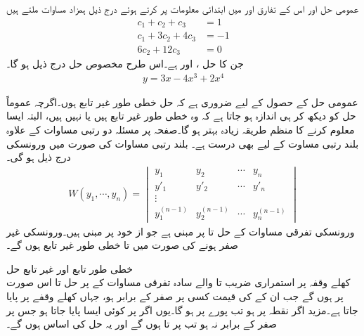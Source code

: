 عمومی حل اور اس کے تفارق  اور  میں ابتدائی معلومات پر کرتے ہوئے درج ذیل ہمزاد مساوات ملتے ہیں
\begin{align*}
c_1+c_2+c_3&=1\\
c_1+3c_2+4c_3&=-1\\
6c_2+12c_3&=0
\end{align*}
جن کا حل ،  اور  ہے۔اس طرح مخصوص حل درج ذیل ہو گا۔
\begin{align*}
y=3x-4x^3+2x^4
\end{align*}

عمومی حل کے حصول کے لیے ضروری ہے کہ حل خطی طور غیر تابع ہوں۔اگرچہ عموماً حل کو دیکھ کر ہی اندازہ ہو جاتا ہے کہ  وہ خطی طور غیر تابع ہیں یا نہیں ہیں، البتہ ایسا معلوم کرنے کا منظم طریقہ زیادہ بہتر ہو گا۔صفحہ  پر مسئلہ  دو رتبی   مساوات کے علاوہ بلند رتبی مساوت کے لیے بھی درست ہے۔ بلند رتبی مساوات کی صورت میں ورونسکی درج ذیل ہو گی۔
\begin{align}\label{مساوات_سادہ_بلند_ورونسکی_الف}
W(y_1,\cdots, y_n)=
\begin{vmatrix}
y_1 & y_2 & \cdots & y_n\\
y'_1 & y'_2 & \cdots & y'_n\\
\vdots & & \\
y_1^{(n-1)} & y_2^{(n-1)} & \cdots & y_n^{(n-1)}
\end{vmatrix}
\end{align}
ورونسکی تفرقی مساوات کے حل  تا  پر مبنی ہے جو از خود  پر مبنی ہیں۔ورونسکی غیر صفر ہونے کی صورت میں   تا  خطی طور غیر تابع ہوں گے۔

\quad خطی طور تابع اور غیر تابع حل\\
کھلے وقفہ  پر استمراری   ضریب   تا    والے سادہ تفرقی  مساوات  کے   پر حل  تا  اس صورت  پر   ہوں گے جب ان کے  کی قیمت  کسی  پر صفر کے برابر  ہو، جہاں  کھلے وقفے  پر پایا جاتا ہے۔مزید اگر  نقطہ  پر  ہو تب پورے  پر   ہو گا۔یوں اگر  پر کوئی ایسا  پایا جاتا ہو جس پر  صفر کے برابر نہ ہو تب  پر   تا   ہوں گے  اور یہ حل کی اساس ہوں گے۔


